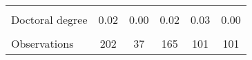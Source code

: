 \begin{tabular*}{\hsize}{@{\hskip\tabcolsep\extracolsep\fill}l*{5}{c}}
                    &            &            &            &            &            \\
\hspace{0.5cm}Doctoral degree&        0.02&        0.00&        0.02&        0.03&        0.00\\
                    &            &            &            &            &            \\
\hline
Observations        &         202&          37&         165&         101&         101\\
\hline\hline
\end{tabular*}
